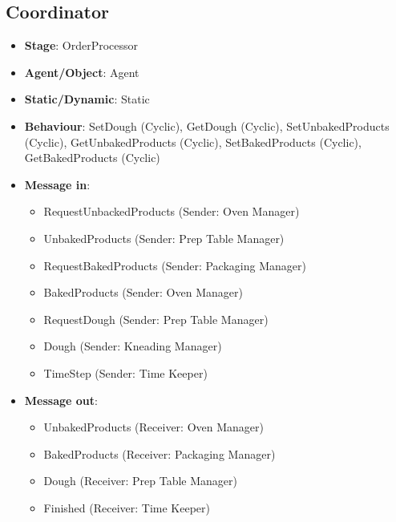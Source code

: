 \documentclass[12pt]{article}
\begin{document}
\subsection{Coordinator}%
\label{sub:idle_manager}
\begin{itemize}
    \item \textbf{Stage}: OrderProcessor
    \item \textbf{Agent/Object}: Agent
    \item \textbf{Static/Dynamic}: Static
    \item \textbf{Behaviour}: SetDough (Cyclic), GetDough (Cyclic), SetUnbakedProducts (Cyclic), GetUnbakedProducts (Cyclic), SetBakedProducts (Cyclic), GetBakedProducts (Cyclic)
    \item \textbf{Message in}:
        \begin{itemize}
            \item RequestUnbackedProducts (Sender: Oven Manager)
            \item UnbakedProducts (Sender: Prep Table Manager)
            \item RequestBakedProducts (Sender: Packaging Manager)
            \item BakedProducts (Sender: Oven Manager)
            \item RequestDough (Sender: Prep Table Manager)
            \item Dough (Sender: Kneading Manager)
            \item TimeStep (Sender: Time Keeper)
        \end{itemize}
    \item \textbf{Message out}:
        \begin{itemize}
            \item UnbakedProducts (Receiver: Oven Manager)
            \item BakedProducts   (Receiver: Packaging Manager)
            \item Dough           (Receiver: Prep Table Manager)
            \item Finished (Receiver: Time Keeper)
        \end{itemize}
\end{itemize}

\newpage{}
\end{document}
